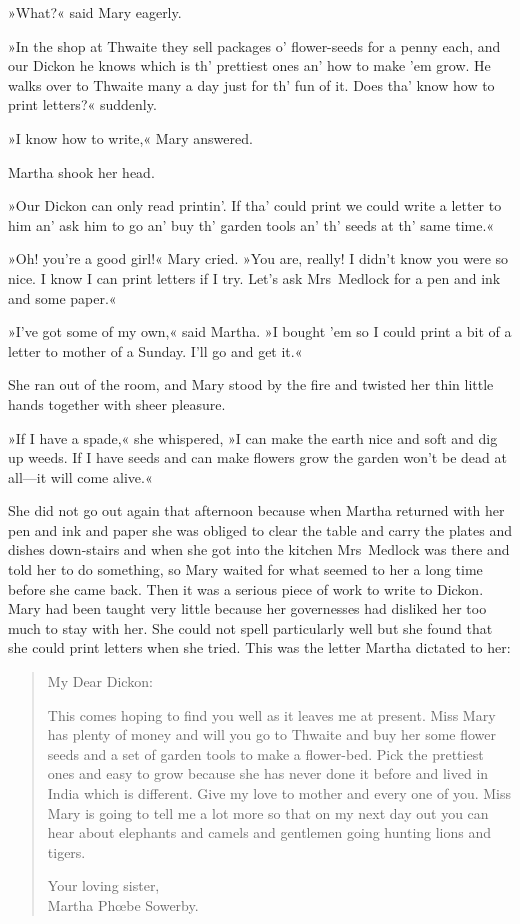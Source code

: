 »What?« said Mary eagerly.

»In the shop at Thwaite they sell packages o' flower-seeds for a penny each, and our Dickon he knows which is th' prettiest ones an' how to make 'em grow. He walks over to Thwaite many a day just for th' fun of it. Does tha' know how to print letters?« suddenly.

»I know how to write,« Mary answered.

Martha shook her head.

»Our Dickon can only read printin'. If tha' could print we could write a letter to him an' ask him to go an' buy th' garden tools an' th' seeds at th' same time.«

»Oh! you're a good girl!« Mary cried. »You are, really! I didn't know you were so nice. I know I can print letters if I try. Let's ask Mrs~Medlock for a pen and ink and some paper.«

»I've got some of my own,« said Martha. »I bought 'em so I could print a bit of a letter to mother of a Sunday. I'll go and get it.«

She ran out of the room, and Mary stood by the fire and twisted her thin little hands together with sheer pleasure.

»If I have a spade,« she whispered, »I can make the earth nice and soft and dig up weeds. If I have seeds and can make flowers grow the garden won't be dead at all—it will come alive.«

She did not go out again that afternoon because when Martha returned with her pen and ink and paper she was obliged to clear the table and carry the plates and dishes down-stairs and when she got into the kitchen Mrs~Medlock was there and told her to do something, so Mary waited for what seemed to her a long time before she came back. Then it was a serious piece of work to write to Dickon. Mary had been taught very little because her governesses had disliked her too much to stay with her. She could not spell particularly well but she found that she could print letters when she tried. This was the letter Martha dictated to her:

\begin{quotation}
\noindent My Dear Dickon:

This comes hoping to find you well as it leaves me at present. Miss Mary has plenty of money and will you go to Thwaite and buy her some flower seeds and a set of garden tools to make a flower-bed. Pick the prettiest ones and easy to grow because she has never done it before and lived in India which is different. Give my love to mother and every one of you. Miss Mary is going to tell me a lot more so that on my next day out you can hear about elephants and camels and gentlemen going hunting lions and tigers.

\begin{flushright}
Your loving sister,\\
Martha Phœbe Sowerby.
\end{flushright}
\end{quotation}

